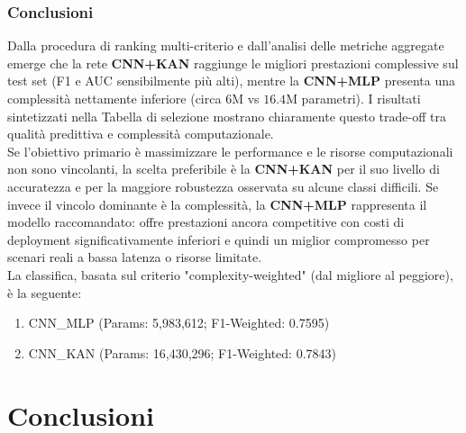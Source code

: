 \documentclass[a4paper,12pt]{report}
\begin{document}
	\subsection{Conclusioni}
	
	Dalla procedura di ranking multi-criterio e dall'analisi delle metriche aggregate emerge che la rete \textbf{CNN+KAN} raggiunge le migliori prestazioni complessive sul test set (F1 e AUC sensibilmente più alti), mentre la \textbf{CNN+MLP} presenta una complessità nettamente inferiore (circa $6$M vs $16.4$M parametri). I risultati sintetizzati nella Tabella di selezione mostrano chiaramente questo trade-off tra qualità predittiva e complessità computazionale. \\
	Se l'obiettivo primario è massimizzare le performance e le risorse computazionali non sono vincolanti, la scelta preferibile è la \textbf{CNN+KAN} per il suo livello di accuratezza e per la maggiore robustezza osservata su alcune classi difficili. Se invece il vincolo dominante è la complessità, la \textbf{CNN+MLP} rappresenta il modello raccomandato: offre prestazioni ancora competitive con costi di deployment significativamente inferiori e quindi un miglior compromesso per scenari reali a bassa latenza o risorse limitate. \\
	La classifica, basata sul criterio "complexity-weighted" (dal migliore al peggiore), è la seguente:
	\begin{enumerate}
		\item CNN\_MLP \quad (Params: 5,983,612; F1-Weighted: 0.7595)
		\item CNN\_KAN \quad (Params: 16,430,296; F1-Weighted: 0.7843)
	\end{enumerate}
	
	\chapter*{Conclusioni}
	
\end{document}
